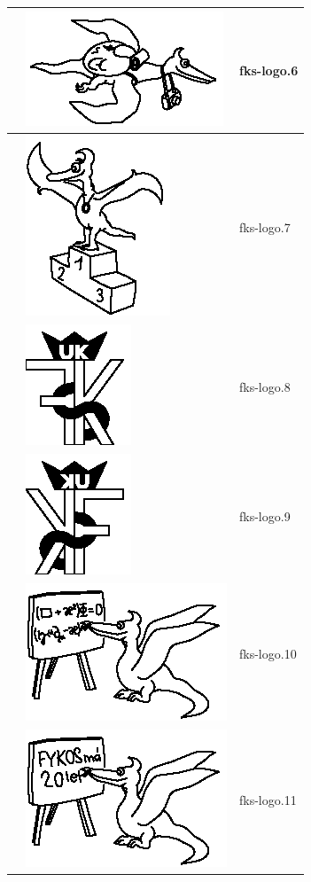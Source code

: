\documentclass[a4paper,10pt]{article}
\begin{document}
\begin{tabularx}{\textwidth}{|l|l|X|}
    &\includegraphics{fks-logo_6}& fks-logo.6\\\hline
    &\includegraphics{fks-logo_7}& fks-logo.7\\\hline
    &\includegraphics{fks-logo_8}& fks-logo.8\\\hline
    &\includegraphics{fks-logo_9}& fks-logo.9\\\hline
    &\includegraphics{fks-logo_10}& fks-logo.10\\\hline
    &\includegraphics{fks-logo_11}& fks-logo.11\\\hline

\end{tabularx}
\end{document}
